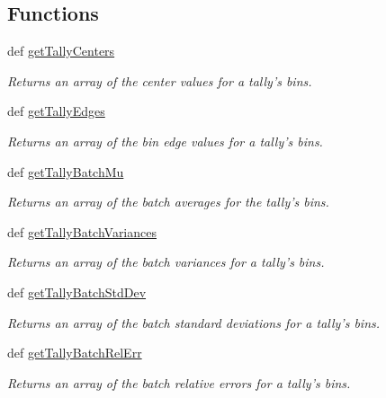 \subsection*{Functions}
\begin{DoxyCompactItemize}
\item 
def \hyperlink{namespacepinspec_1_1process_a4a994b613e53287a126b8b5263daa6ff}{get\-Tally\-Centers}
\begin{DoxyCompactList}\small\item\em Returns an array of the center values for a tally's bins. \end{DoxyCompactList}\item 
def \hyperlink{namespacepinspec_1_1process_a9fd8e784cab1f1c96bd490b212a971c0}{get\-Tally\-Edges}
\begin{DoxyCompactList}\small\item\em Returns an array of the bin edge values for a tally's bins. \end{DoxyCompactList}\item 
def \hyperlink{namespacepinspec_1_1process_a8db40966df01a6f67e9cab3c01690964}{get\-Tally\-Batch\-Mu}
\begin{DoxyCompactList}\small\item\em Returns an array of the batch averages for the tally's bins. \end{DoxyCompactList}\item 
def \hyperlink{namespacepinspec_1_1process_a8ff9733e706d305e26797cab749b0eee}{get\-Tally\-Batch\-Variances}
\begin{DoxyCompactList}\small\item\em Returns an array of the batch variances for a tally's bins. \end{DoxyCompactList}\item 
def \hyperlink{namespacepinspec_1_1process_a10ce7b5adb22e27bd1309a068a7f71ed}{get\-Tally\-Batch\-Std\-Dev}
\begin{DoxyCompactList}\small\item\em Returns an array of the batch standard deviations for a tally's bins. \end{DoxyCompactList}\item 
def \hyperlink{namespacepinspec_1_1process_a76f6c9fd781df929bc86b30afffde0a4}{get\-Tally\-Batch\-Rel\-Err}
\begin{DoxyCompactList}\small\item\em Returns an array of the batch relative errors for a tally's bins. \end{DoxyCompactList}\item 

\end{DoxyCompactItemize}
